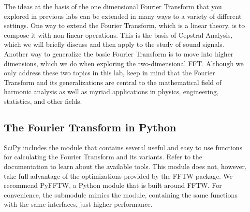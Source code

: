 
The ideas at the basis of the one dimensional Fourier Transform that you explored in previous labs can be
extended in many ways to a variety of different settings. One way to extend the Fourier Transform, which is
a linear theory, is to compose it with non-linear operations. This is the basis of Cepstral Analysis, which we
will briefly discuss and then apply to the study of sound signals. Another way to generalize the basic
Fourier Transform is to move into higher dimensions, which we do when exploring the two-dimensional FFT.
Although we only address these two topics in this lab, keep in mind that the Fourier Transform and its
generalizations are central to the mathematical field of harmonic analysis as well as myriad applications
in physics, engineering, statistics, and other fields.

\subsection*{The Fourier Transform in Python}
SciPy includes the module  that contains several useful and easy to use functions
for calculating the Fourier Transform and its variants. Refer to the documentation to learn about
the available tools. This module does not, however, take full advantage of the optimizations provided
by the FFTW package. We recommend PyFFTW, a Python module that is built around FFTW. For convenience,
the submodule  mimics the  module, containing
the same functions with the same interfaces, just higher-performance.

